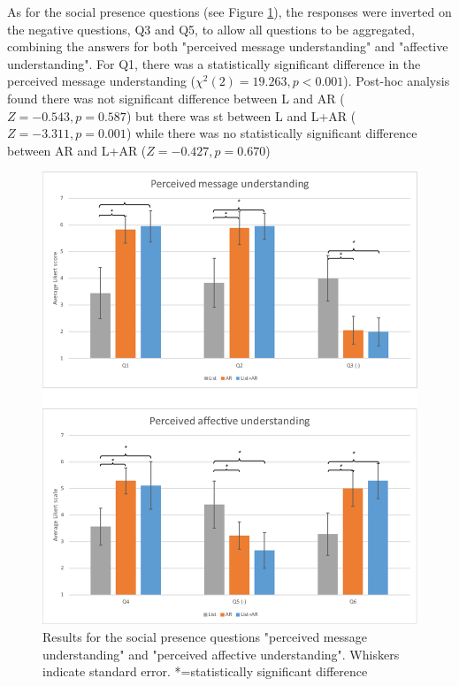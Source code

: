 As for the social presence questions (see Figure \ref{fig:mgia16:social_presence}), the responses were inverted on the negative questions, Q3 and Q5, to allow all questions to be aggregated, combining the answers for both "perceived message understanding" and "affective understanding". 
For Q1, there was a statistically significant difference in the perceived message understanding ($\chi^2(2)=19.263, p<0.001$). Post-hoc analysis found there was not significant difference between L and AR ($Z=-0.543, p=0.587$) but there was st between L and L+AR ($Z=-3.311, p=0.001$) while there was no statistically significant difference between AR and L+AR ($Z=-0.427, p=0.670$)




\begin{figure}[htb]
  \centering
  \includegraphics[width=.8\linewidth]{images/61-video-mgia16/social-presence.eps}
  \caption{Results for the social presence questions "perceived message understanding" and "perceived affective understanding". Whiskers indicate standard error. *=statistically significant difference}
    \label{fig:mgia16:social_presence}
\end{figure}

